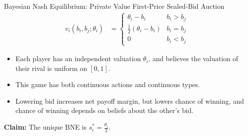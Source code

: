 \documentclass[10pt]{extarticle}
\begin{document}
  \begin{problem}{Bayesian Nash Equilibrium: Private Value First-Price Sealed-Bid Auction}
    \begin{align*}
      v_i(b_i,b_j;\theta_i) &= \begin{cases}
        \theta_i - b_i & b_i > b_j\\
        \frac{1}{2}(\theta_i - b_i) & b_i = b_j\\
        0 & b_i < b_j
      \end{cases}
    \end{align*}
    \begin{itemize}
      \item Each player has an independent valuation $\theta_i$, and believes the valuation of their rival is uniform on $[0,1]$.
      \item This game has both continuous actions and continuous types.
      \item Lowering bid increases net payoff margin, but lowers chance of winning, and chance of winning depends on beliefs about the other's bid.
    \end{itemize}
    \textbf{Claim:} The unique BNE is $s_{i}^{\ast} = \frac{\theta_i}{2}$.\\


\end{problem}
\end{document}
